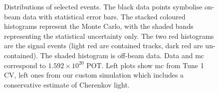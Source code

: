 \begin{figure}[]
\ContinuedFloat
\centering
{} \quad
{} \quad
{} \quad
{} \quad
{} \quad
{} \quad
\caption{Distributions of selected events. The black data points symbolise on-beam data with statistical error bars. The stacked coloured histograms represent the Monte Carlo, with the shaded bands representing the statistical uncertainty only. The two red histograms are the signal events (light red are contained tracks, dark red are un-contained). The shaded histogram is off-beam data. Data and \acrshort{mc} correspond to $1.592 \times 10^{20}$ POT. Left plots show \acrshort{mc} from Tune 1 CV, left ones from our custom simulation which includes a conservative estimate of Cherenkov light.}
\label{fig:cv_ch_comparison}
\end{figure}
